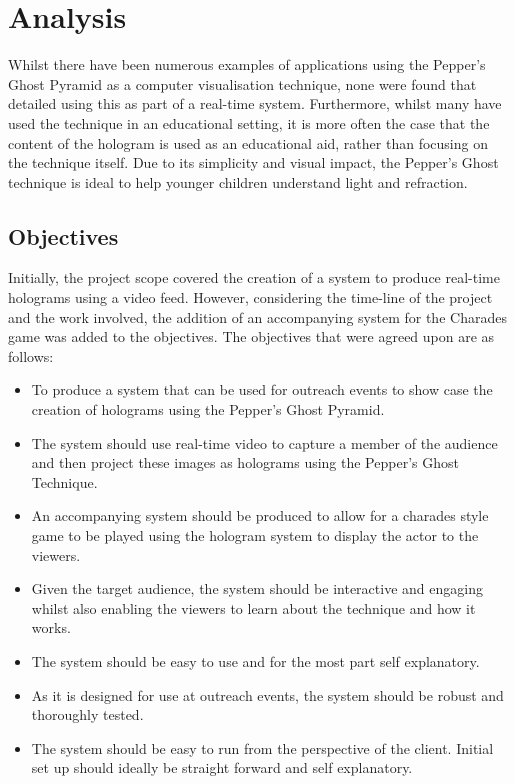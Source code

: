 \section{Analysis}
Whilst there have been numerous examples of applications using the Pepper's Ghost Pyramid as a computer visualisation technique, none were found that detailed using this as part of a real-time system. Furthermore, whilst many have used the technique in an educational setting, it is more often the case that the content of the hologram is used as an educational aid, rather than focusing on the technique itself. Due to its simplicity and visual impact, the Pepper's Ghost technique is ideal to help younger children understand light and refraction.  

\subsection{Objectives}
Initially, the project scope covered the creation of a system to produce real-time holograms using a video feed. However, considering the time-line of the project and the work involved, the addition of an accompanying system for the Charades game was added to the objectives. The objectives that were agreed upon are as follows:

\begin{itemize}
	\item To produce a system that can be used for outreach events to show case the creation of holograms using the Pepper's Ghost Pyramid.
	
	\item The system should use real-time video to capture a member of the audience and then project these images as holograms using the Pepper's Ghost Technique.
	
	\item An accompanying system should be produced to allow for a charades style game to be played using the hologram system to display the actor to the viewers.
	
	\item Given the target audience, the system should be interactive and engaging whilst also enabling the viewers to learn about the technique and how it works.
	
	\item The system should be easy to use and for the most part self explanatory.
	
	\item As it is designed for use at outreach events, the system should be robust and thoroughly tested.
	
	\item The system should be easy to run from the perspective of the client. Initial set up should ideally be straight forward and self explanatory.
\end{itemize}


